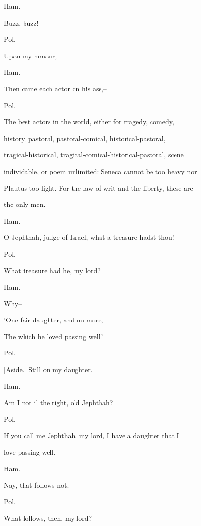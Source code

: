 \documentclass[12pt]{book}
\begin{document}
Ham.

Buzz, buzz!



Pol.

Upon my honour,--



Ham.

Then came each actor on his ass,--



Pol.

The best actors in the world, either for tragedy, comedy,

history, pastoral, pastoral-comical, historical-pastoral,

tragical-historical, tragical-comical-historical-pastoral, scene

individable, or poem unlimited: Seneca cannot be too heavy nor

Plautus too light. For the law of writ and the liberty, these are

the only men.



Ham.

O Jephthah, judge of Israel, what a treasure hadst thou!



Pol.

What treasure had he, my lord?



Ham.

Why--

   'One fair daughter, and no more,

   The which he loved passing well.'





Pol.

[Aside.] Still on my daughter.



Ham.

Am I not i' the right, old Jephthah?



Pol.

If you call me Jephthah, my lord, I have a daughter that I

love passing well.



Ham.

Nay, that follows not.



Pol.

What follows, then, my lord?
\end{document}
